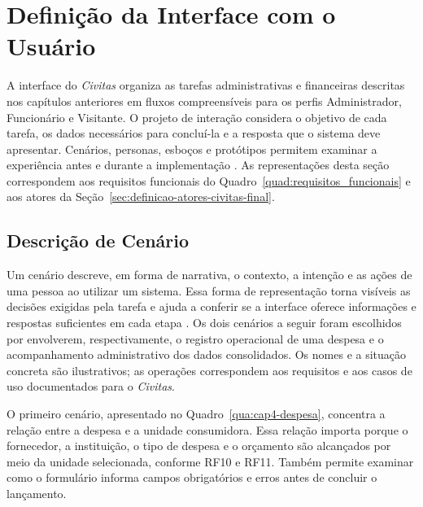 \chapter{Definição da Interface com o Usuário}

A interface do \textit{Civitas} organiza as tarefas administrativas e financeiras descritas nos capítulos anteriores em fluxos compreensíveis para os perfis Administrador, Funcionário e Visitante. O projeto de interação considera o objetivo de cada tarefa, os dados necessários para concluí-la e a resposta que o sistema deve apresentar. Cenários, personas, esboços e protótipos permitem examinar a experiência antes e durante a implementação \parencite{Rogers2013,Garrett2011}. As representações desta seção correspondem aos requisitos funcionais do Quadro~\ref{quad:requisitos_funcionais} e aos atores da Seção~\ref{sec:definicao-atores-civitas-final}.

\section{Descrição de Cenário}

Um cenário descreve, em forma de narrativa, o contexto, a intenção e as ações de uma pessoa ao utilizar um sistema. Essa forma de representação torna visíveis as decisões exigidas pela tarefa e ajuda a conferir se a interface oferece informações e respostas suficientes em cada etapa \parencite{Rogers2013}. Os dois cenários a seguir foram escolhidos por envolverem, respectivamente, o registro operacional de uma despesa e o acompanhamento administrativo dos dados consolidados. Os nomes e a situação concreta são ilustrativos; as operações correspondem aos requisitos e aos casos de uso documentados para o \textit{Civitas}.

O primeiro cenário, apresentado no Quadro~\ref{qua:cap4-despesa}, concentra a relação entre a despesa e a unidade consumidora. Essa relação importa porque o fornecedor, a instituição, o tipo de despesa e o orçamento são alcançados por meio da unidade selecionada, conforme RF10 e RF11. Também permite examinar como o formulário informa campos obrigatórios e erros antes de concluir o lançamento.

